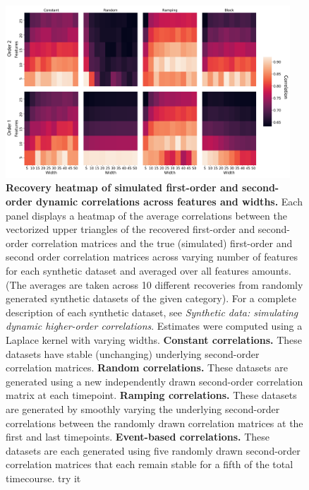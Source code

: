 \documentclass{article}
\begin{document}
\begin{figure}[p!]
\centering
\includegraphics[width=0.95\textwidth]{figs/sim_heatmaps_features}
  \caption{\textbf{Recovery heatmap of simulated first-order and
      second-order dynamic correlations across features and widths.}  Each panel displays a
    heatmap of the average correlations
    between the vectorized upper triangles of the recovered
    first-order and second-order correlation matrices and the true
    (simulated) first-order and second order correlation matrices
    across varying number of features for each synthetic dataset and averaged
    over all features amounts.  (The averages are taken
    across 10 different recoveries from
    randomly generated synthetic datasets of the given category).  For a complete description of each synthetic dataset,
    see \textit{Synthetic data: simulating dynamic higher-order
      correlations}.  Estimates were computed using a Laplace kernel
    with varying widths.  \textbf{ Constant correlations.}  These datasets
    have stable (unchanging) underlying second-order correlation
    matrices.  \textbf{Random correlations.} These datasets are
    generated using a new independently drawn second-order correlation
    matrix at each timepoint.  \textbf{Ramping correlations.}
    These datasets are generated by smoothly varying the underlying
    second-order correlations between the randomly drawn correlation
    matrices at the first and last timepoints.  \textbf{Event-based
      correlations.}  These datasets are each generated using five
    randomly drawn second-order correlation matrices that each remain
    stable for a fifth of the total timecourse. try it}
\label{fig:features}
\end{figure}
\end{document}
